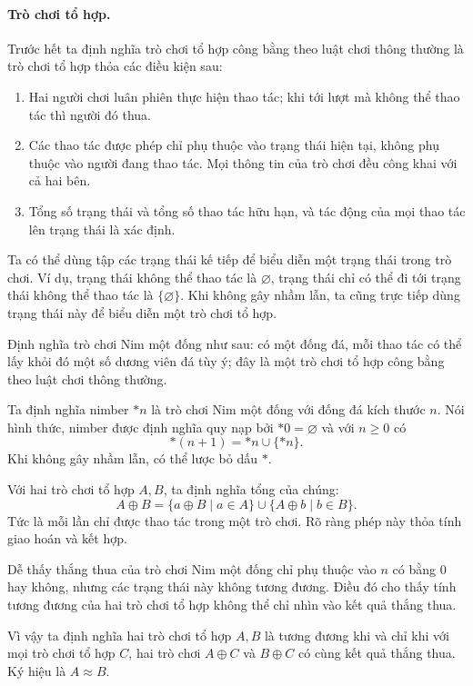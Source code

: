 \documentclass[11pt]{article}
\begin{document}
\paragraph{Trò chơi tổ hợp.}
Trước hết ta định nghĩa trò chơi tổ hợp công bằng theo luật chơi thông thường là
trò chơi tổ hợp thỏa các điều kiện sau:

\begin{enumerate}
  \item Hai người chơi luân phiên thực hiện thao tác; khi tới lượt mà không thể
  thao tác thì người đó thua.
  \item Các thao tác được phép chỉ phụ thuộc vào trạng thái hiện tại, không phụ
  thuộc vào người đang thao tác. Mọi thông tin của trò chơi đều công khai với
  cả hai bên.
  \item Tổng số trạng thái và tổng số thao tác hữu hạn, và tác động của mọi thao
  tác lên trạng thái là xác định.
\end{enumerate}

Ta có thể dùng tập các trạng thái kế tiếp để biểu diễn một trạng thái trong trò
chơi. Ví dụ, trạng thái không thể thao tác là \(\varnothing\), trạng thái chỉ có
thể đi tới trạng thái không thể thao tác là \(\{\varnothing\}\). Khi không gây
nhầm lẫn, ta cũng trực tiếp dùng trạng thái này để biểu diễn một trò chơi tổ
hợp.

Định nghĩa trò chơi Nim một đống như sau: có một đống đá, mỗi thao tác có thể
lấy khỏi đó một số dương viên đá tùy ý; đây là một trò chơi tổ hợp công bằng
theo luật chơi thông thường.

Ta định nghĩa nimber \(*n\) là trò chơi Nim một đống với đống đá kích thước
\(n\). Nói hình thức, nimber được định nghĩa quy nạp bởi \(*0=\varnothing\) và
với \(n\ge 0\) có
\[
  *(n+1)=*n\cup\{*n\}.
\]
Khi không gây nhầm lẫn, có thể lược bỏ dấu \(*\).

Với hai trò chơi tổ hợp \(A,B\), ta định nghĩa tổng của chúng:
\[
  A\oplus B=\{a\oplus B\mid a\in A\}\cup\{A\oplus b\mid b\in B\}.
\]
Tức là mỗi lần chỉ được thao tác trong một trò chơi. Rõ ràng phép này thỏa tính
giao hoán và kết hợp.

Dễ thấy thắng thua của trò chơi Nim một đống chỉ phụ thuộc vào \(n\) có bằng
\(0\) hay không, nhưng các trạng thái này không tương đương. Điều đó cho thấy
tính tương đương của hai trò chơi tổ hợp không thể chỉ nhìn vào kết quả thắng
thua.

Vì vậy ta định nghĩa hai trò chơi tổ hợp \(A,B\) là tương đương khi và chỉ khi
với mọi trò chơi tổ hợp \(C\), hai trò chơi \(A\oplus C\) và \(B\oplus C\) có
cùng kết quả thắng thua. Ký hiệu là \(A\approx B\).
\end{document}
